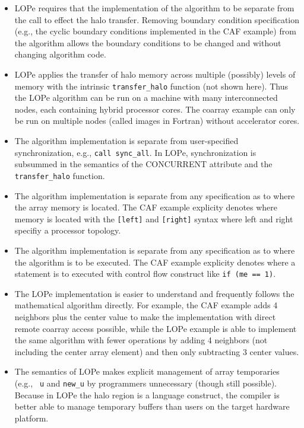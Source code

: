 \begin{itemize}

\item
LOPe requires that the implementation of the algorithm to be separate from the
call to effect the halo transfer.  Removing boundary condition specification
(e.g., the cyclic boundary conditions implemented in the CAF example) from the
algorithm allows the boundary conditions to be changed and without changing
algorithm code.

\item
LOPe applies the transfer of halo memory across multiple (possibly) levels of
memory with the intrinsic {\tt transfer\_halo} function (not shown here).  Thus
the LOPe algorithm can be run on a machine with many interconnected nodes, each
containing hybrid processor cores.  The coarray example can only be run on
multiple nodes (called images in Fortran) without accelerator cores.

\item
The algorithm implementation is separate from user-specified synchronization,
e.g., {\tt call sync\_all}.  In LOPe, synchronization is subsummed in the
semantics of the CONCURRENT attribute and the {\tt transfer\_halo} function.

\item
The algorithm implementation is separate from any specification as to where the
array memory is located.  The CAF example explicity denotes where memory is
located with the {\tt [left]} and {\tt [right]} syntax where left and right
specifiy a processor topology.

\item
The algorithm implementation is separate from any specification as to where the
algorithm is to be executed.  The CAF example explicity denotes where a statement is to
executed with control flow construct like {\tt if (me == 1)}.

\item
The LOPe implementation is easier to understand and frequently follows the
mathematical algorithm directly.  For example, the CAF example adds 4 neighbors
plus the center value to make the implementation with direct remote coarray
access possible, while the LOPe example is able to implement the same algorithm
with fewer operations by adding 4 neighbors (not including the center array
element) and then only subtracting 3 center values.

\item
The semantics of LOPe makes explicit management of array temporaries (e.g., {\tt
  u} and {\tt new\_u} by programmers unnecessary (though still possible).
Because in LOPe the halo region is a language construct, the compiler is better
able to manage temporary buffers than users on the target hardware platform.

\end{itemize}

